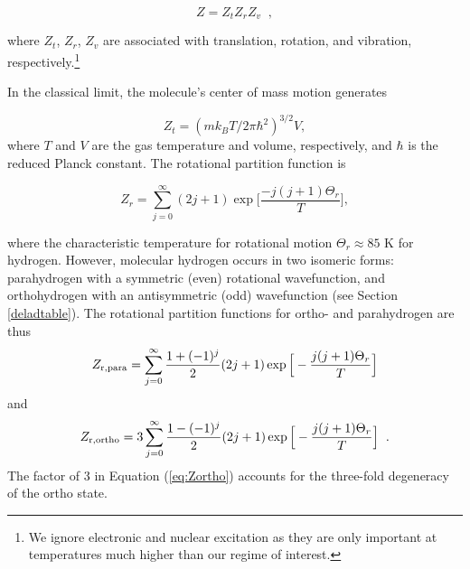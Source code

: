 
\begin{equation}
\label{eq:zagain}
Z=Z_t Z_r Z_v \;\;,
\end{equation} 

\noindent where $Z_t$, $Z_r$, $Z_v$ are associated with translation, rotation, and vibration, respectively.\footnote{We ignore electronic and nuclear excitation as they are only important at temperatures much higher than our regime of interest.}  %


In the classical limit, the molecule's center of mass motion generates

\begin{equation}
\label{eq:Zt}
Z_t=(m k_B T/2 \pi \hbar^2)^{3/2} V,
\end{equation}
where  $T$ and $V$ are the gas temperature and volume, respectively, and $\hbar$ is the reduced Planck constant. The rotational partition function is

\begin{equation}
\label{eq:Zr}
Z_r=\sum_{j=0}^\infty (2 j+1) \exp{\Big[\frac{-j (j+1)\Theta_r}{T}\Big]},
\end{equation}

\noindent where the characteristic temperature for rotational motion $\Theta_r \approx 85$ K  for hydrogen. However, molecular hydrogen occurs in two isomeric forms: parahydrogen with a symmetric (even) rotational wavefunction, and orthohydrogen with an antisymmetric (odd) wavefunction (see Section \ref{deladtable}). %
The rotational partition functions for ortho- and parahydrogen are thus
\begin{equation}
\label{eq:Zpara}
Z_{\rm{r,para}}=\sum_{j=0}^\infty \frac{1+(-1)^j}{2} (2 j +1) \exp\Big[-\frac{j(j+1)\Theta_r}{T}\Big]
\end{equation}
and
\begin{equation}
\label{eq:Zortho}
Z_{\rm{r,ortho}}=3\sum_{j=0}^\infty \frac{1-(-1)^j}{2} (2 j +1) \exp\Big[-\frac{j(j+1)\Theta_r}{T}\Big] \;\;.
\end{equation}
The factor of 3 in Equation (\ref{eq:Zortho}) accounts for the three-fold degeneracy of the ortho state.

